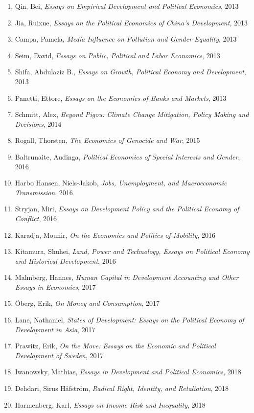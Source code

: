 \begin{spacing}{.5}
\begin{enumerate}
\item Qin, Bei, \emph{Essays on Empirical Development and Political Economics},
2013
\item Jia, Ruixue, \emph{Essays on the Political Economics of China's 
Development},
2013
\item Campa, Pamela, \emph{Media Influence on Pollution and Gender Equality},
2013
\item Seim, David, \emph{Essays on Public, Political and Labor Economics},
2013
\item Shifa, Abdulaziz B., \emph{Essays on Growth, Political Economy and
Development}, 2013
\item Panetti, Ettore, \emph{Essays on the Economics of Banks and Markets},
2013
\item Schmitt, Alex, \emph{Beyond Pigou: Climate Change Mitigation, Policy
Making and Decisions}, 2014
\item Rogall, Thorsten, \emph{The Economics of Genocide and War}, 2015
\item Baltrunaite, Audinga, \emph{Political Economics of Special Interests
and Gender}, 2016
\item Harbo Hansen, Niels-Jakob, \emph{Jobs, Unemployment, and Macroeconomic
Transmission}, 2016
\item Stryjan, Miri, \emph{Essays on Development Policy and the Political
Economy of Conflict}, 2016
\item Karadja, Mounir, \emph{On the Economics and Politics of Mobility},
2016
\item Kitamura, Shuhei, \emph{Land, Power and Technology, Essays on Political
Economy and Historical Development}, 2016
\item Malmberg, Hannes, \emph{Human Capital in Development Accounting and
Other Essays in Economics}, 2017
\item \"Oberg, Erik, \emph{On Money and Consumption}, 2017
\item Lane, Nathaniel, \emph{States of Development: Essays on the Political
Economy of Development in Asia}, 2017
\item Prawitz, Erik, \emph{On the Move: Essays on the Economic and Political
Development of Sweden}, 2017
\item Iwanowsky, Mathias, \emph{Essays in Development and Political Economics},
2018
\item Dehdari, Sirus H\aa fstr\"om, \emph{Radical Right, Identity, and Retaliation},
2018
\item Harmenberg, Karl, \emph{Essays on Income Risk and Inequality}, 2018

\end{enumerate}
\end{spacing}
